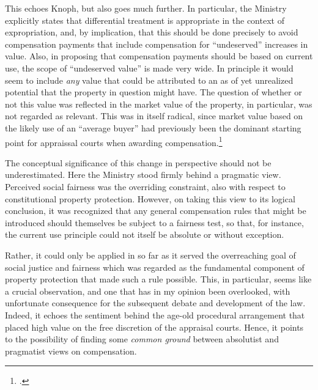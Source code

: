 This echoes Knoph, but also goes much further. In particular, the Ministry explicitly states that differential treatment is appropriate in the context of expropriation, and, by implication, that this should be done precisely to avoid compensation payments that include compensation for ``undeserved'' increases in value. Also, in proposing that compensation payments should be based on current use, the scope of ``undeserved value'' is made very wide. In principle it would seem to include \emph{any} value that could be attributed to an as of yet unrealized potential that the property in question might have. The question of whether or not this value was reflected in the market value of the property, in particular, was not regarded as relevant. This was in itself radical, since market value based on the likely use of an ``average buyer'' had previously been the dominant starting point for appraissal courts when awarding compensation.\footcite[112-113]{nut69}

The conceptual significance of this change in perspective should not be underestimated. Here the Ministry stood firmly behind a pragmatic view. Perceived social fairness was the overriding constraint, also with respect to constitutional property protection. However, on taking this view to its logical conclusion, it was recognized that any general compensation rules that might be introduced should themselves be subject to a fairness test, so that, for instance, the current use principle could not itself be absolute or without exception. 

Rather, it could only be applied in so far as it served the overreaching goal of social justice and fairness which was regarded as the fundamental component of property protection that made such a rule possible. This, in particular, seems like a crucial observation, and one that has in my opinion been overlooked, with unfortunate consequence for the subsequent debate and development of the law. Indeed, it echoes the sentiment behind the age-old procedural arrangement that placed high value on the free discretion of the appraisal courts. Hence, it points to the possibility of finding some \emph{common ground} between absolutist and pragmatist views on compensation.

